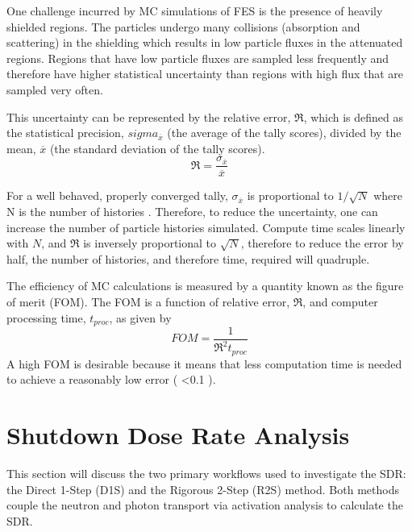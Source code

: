 One challenge incurred by MC simulations of FES is the presence of heavily
shielded regions.  The particles undergo many
collisions (absorption and scattering) in the shielding which results in low
particle fluxes in the attenuated regions.  Regions that have low
particle fluxes are sampled less frequently and therefore have higher
statistical uncertainty than regions with high flux that are sampled very
often.

This uncertainty can be represented by the relative error, $\Re$,
which is defined as the statistical precision, $sigma_{\overline{x}}$ (the average of
the tally scores), divided by the mean, $\overline{x}$ (the standard
deviation of the tally scores).  
\begin{equation} \label{eq:1.2}
		\Re = \frac{\sigma_{\overline{x}}}{{\overline{x}}}
\end{equation}

For a well behaved, properly converged tally, $\sigma_{\overline{x}}$ is proportional
to $1/\sqrt{N}$ where N is the number
of histories \cite{mcnp_manual}.
Therefore, to reduce the uncertainty, one can 
increase the number of particle histories simulated.
Compute time scales linearly with $N$, and
$\Re$ is inversely proportional to $\sqrt{N}$, therefore to reduce the
error by half, the number of histories, and therefore time, required will
quadruple.  

The efficiency of MC calculations is measured by a quantity known as the figure of merit
(FOM).  The FOM is a function of relative error, $\Re$, and computer processing
time, $t_{proc}$, 
as given by
\begin{equation} \label{eq:1.3}
	FOM = \frac{1}{{{{\Re}^2}t_{proc}}}
\end{equation}
A high FOM is desirable because it means that less computation time is needed to achieve
a reasonably low error ( <0.1 \cite{mcnp_manual}).   

\section{Shutdown Dose Rate Analysis}\label{sec:sdr_calcs}
This section will discuss the two primary workflows used to investigate the SDR:
the Direct 1-Step (D1S) \cite{d1s} and the Rigorous 2-Step (R2S) \cite{r2s}
method.  Both methods couple the neutron and photon transport via activation
analysis to calculate the SDR.

